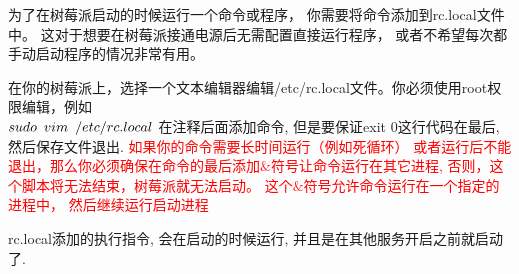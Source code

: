 为了在树莓派启动的时候运行一个命令或程序，
你需要将命令添加到rc.local文件中。
这对于想要在树莓派接通电源后无需配置直接运行程序，
或者不希望每次都手动启动程序的情况非常有用。
\par 在你的树莓派上，选择一个文本编辑器编辑/etc/rc.local文件。你必须使用root权限编辑，例如
\\ $sudo\hspace{0.5em} vim\hspace{0.5em} /etc/rc.local$ 在注释后面添加命令, 但是要保证exit 0这行代码在最后, 然后保存文件退出. 
\textcolor{red}{如果你的命令需要长时间运行（例如死循环）
或者运行后不能退出，那么你必须确保在命令的最后添加$\&$符号让命令运行在其它进程, 
否则，这个脚本将无法结束，树莓派就无法启动。
这个$\&$符号允许命令运行在一个指定的进程中，
然后继续运行启动进程} \par
rc.local添加的执行指令, 会在启动的时候运行, 并且是在其他服务开启之前就启动了. 

